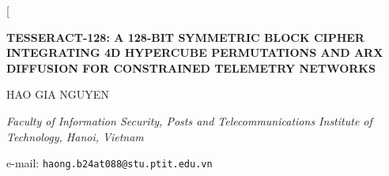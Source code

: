 \documentclass[10pt,twocolumn]{article}
\begin{document}
\twocolumn[
  \begin{@twocolumnfalse}
    \vspace{0.8cm}
    \begin{center}
      {\large \bfseries \MakeUppercase{Tesseract-128: A 128-Bit Symmetric Block Cipher Integrating 4D Hypercube Permutations and ARX Diffusion for Constrained Telemetry Networks}\par}
      \vspace{0.6cm}
      
      {\normalsize \MakeUppercase{Hao Gia Nguyen}\par}
      \vspace{0.4cm}
      
      {\small \textit{Faculty of Information Security, Posts and Telecommunications Institute of Technology, Hanoi, Vietnam}\par}
      \vspace{0.1cm}
      
      {\small e-mail: \texttt{haong.b24at088@stu.ptit.edu.vn}\par}
      \vspace{0.6cm}
    \end{center}


\end{@twocolumnfalse}
\end{document}
